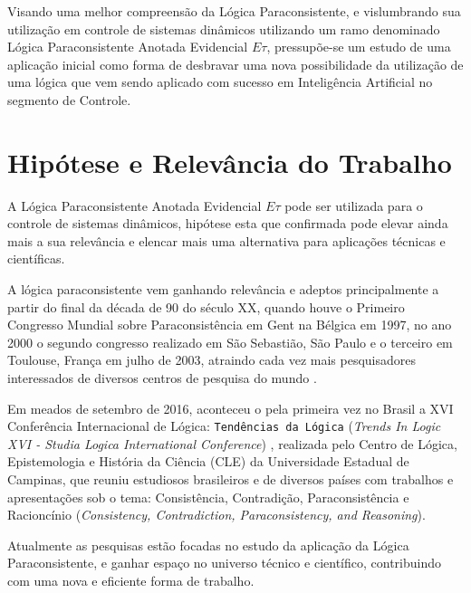 Visando uma melhor compreensão da Lógica Paraconsistente, 
e vislumbrando sua utilização em controle de sistemas dinâmicos 
utilizando um ramo denominado 
Lógica Paraconsistente Anotada Evidencial $E\tau$, 
pressupõe-se um estudo de uma aplicação inicial 
como forma de desbravar uma nova possibilidade da utilização 
de uma lógica que vem sendo aplicado com sucesso em 
Inteligência Artificial no segmento de Controle.






\section{Hipótese e Relevância do Trabalho}
A Lógica Paraconsistente Anotada Evidencial $E\tau$ 
pode ser utilizada para o controle de sistemas dinâmicos, 
hipótese esta que confirmada pode elevar ainda mais a sua relevância e 
elencar mais uma alternativa para aplicações técnicas e científicas. 

A lógica paraconsistente vem ganhando relevância e adeptos 
principalmente a partir do final da década de 90 do século XX, 
quando houve o Primeiro Congresso Mundial sobre 
Paraconsistência em Gent na Bélgica em 1997, 
no ano 2000 o segundo congresso realizado em São Sebastião, São Paulo e o 
terceiro em Toulouse, França em julho de 2003, 
atraindo cada vez mais pesquisadores interessados de 
diversos centros de pesquisa do mundo \cite{DecioKrause}. 

Em meados de setembro de 2016, 
aconteceu o pela primeira vez no Brasil a 
XVI Conferência Internacional de Lógica: 
\texttt{Tendências da Lógica} (\emph{Trends In Logic XVI - 
Studia Logica International Conference}) \cite{trendsinlogic}, 
realizada pelo Centro de Lógica, Epistemologia e História da Ciência (CLE) da 
Universidade Estadual de Campinas, 
que reuniu estudiosos brasileiros e de diversos países com 
trabalhos e apresentações sob o tema: 
Consistência, Contradição, Paraconsistência e Racioncínio 
(\emph{Consistency, Contradiction, Paraconsistency, and Reasoning}).

Atualmente as pesquisas estão focadas no estudo da 
aplicação da Lógica Paraconsistente, 
e ganhar espaço no universo técnico e científico, 
contribuindo com uma nova e eficiente forma de trabalho.





